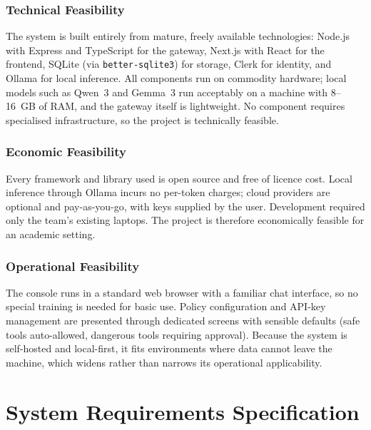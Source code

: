 \documentclass[12pt,a4paper,oneside]{report}
\begin{document}
\subsection{Technical Feasibility}
The system is built entirely from mature, freely available
technologies: Node.js with Express and TypeScript for the gateway,
Next.js with React for the frontend, SQLite (via
\texttt{better-sqlite3}) for storage, Clerk for identity, and Ollama
for local inference. All components run on commodity hardware; local
models such as Qwen~3 and Gemma~3 run acceptably on a machine with
8--16~GB of RAM, and the gateway itself is lightweight. No component
requires specialised infrastructure, so the project is technically
feasible.

\subsection{Economic Feasibility}
Every framework and library used is open source and free of licence
cost. Local inference through Ollama incurs no per-token charges;
cloud providers are optional and pay-as-you-go, with keys supplied by
the user. Development required only the team's existing laptops.
The project is therefore economically feasible for an academic
setting.

\subsection{Operational Feasibility}
The console runs in a standard web browser with a familiar chat
interface, so no special training is needed for basic use. Policy
configuration and API-key management are presented through dedicated
screens with sensible defaults (safe tools auto-allowed, dangerous
tools requiring approval). Because the system is self-hosted and
local-first, it fits environments where data cannot leave the
machine, which widens rather than narrows its operational
applicability.

\chapter{System Requirements Specification}
\end{document}
